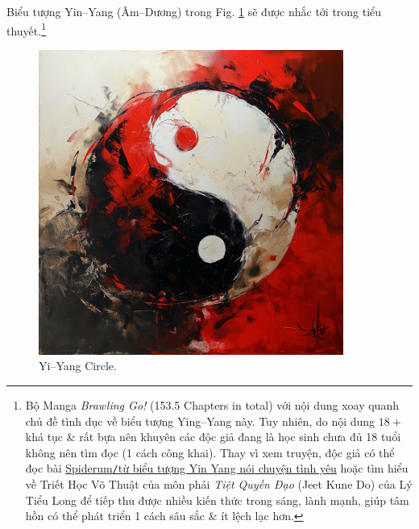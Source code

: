 \documentclass[12pt,oneside]{book}
\begin{document}
Biểu tượng Yin--Yang (Âm--Dương) trong Fig. \ref{fig: yin yang} sẽ được nhắc tới trong tiểu thuyết.\footnote{Bộ Manga {\it Brawling Go!} (153.5 Chapters in total) với nội dung xoay quanh chủ đề tình dục về biểu tượng Ying--Yang này. Tuy nhiên, do nội dung $18+$ khá tục \& rất bựa nên khuyên các độc giả đang là học sinh chưa đủ 18 tuổi không nên tìm đọc (1 cách công khai). Thay vì xem truyện, độc giả có thể đọc bài \href{https://spiderum.com/bai-dang/Tu-bieu-tuong-Yin-Yang-noi-chuyen-tinh-yeu-V1x7oz6fQnOg}{Spiderum{\tt/}từ biểu tượng Yin Yang nói chuyện tình yêu} hoặc tìm hiểu về Triết Học Võ Thuật của môn phái {\it Tiệt Quyền Đạo} (Jeet Kune Do) của {\sc Lý Tiểu Long} để tiếp thu được nhiều kiến thức trong sáng, lành mạnh, giúp tâm hồn có thể phát triển 1 cách sâu sắc \& ít lệch lạc hơn.}
\begin{figure}[H]
	\centering
	\includegraphics[width=10cm]{ying_yang}
	\caption{Yi--Yang Circle.}
	\label{fig: yin yang}
\end{figure}

\end{document}
